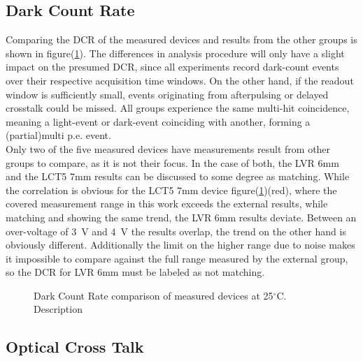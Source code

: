 \documentclass[12pt,article,type=msc,colorback,accentcolor=tud9c]{tudthesis}
\begin{document}
\subsection{Dark Count Rate}
\label{subsec:DC_DCR}

Comparing the DCR of the measured devices and results from the other groups is shown in figure(\ref{fig:DC_DCR}). The differences in analysis procedure will only have a slight impact on the presumed DCR, since all experiments record dark-count events over their respective acquisition time windows. On the other hand, if the readout window is sufficiently small, events originating from afterpulsing or delayed crosstalk could be missed. All groups experience the same multi-hit coincidence, meaning a light-event or dark-event coinciding with another, forming a (partial)multi p.e. event.\\
Only two of the five measured devices have measurements result from other groups to compare, as it is not their focus. In the case of both, the LVR 6mm and the LCT5 7mm results can be discussed to some degree as matching. While the correlation is obvious for the LCT5 7mm device figure(\ref{fig:DC_DCR})(red), where the covered measurement range in this work exceeds the  external results, while matching and showing the same trend, the LVR 6mm results deviate. Between an over-voltage of 3~V and 4~V the results overlap, the trend on the other hand is obviously different. Additionally the limit on the higher range due to noise makes it impossible to compare against the full range measured by the external group, so the DCR for LVR 6mm must be labeled as not matching. 

\begin{figure}%
\begin{centering}
\caption[DCR device comparison]{Dark Count Rate comparison of measured devices at 25$^\circ$C. Description}
\label{fig:DC_DCR}
\end{centering}
\end{figure}

\subsection{Optical Cross Talk}
\label{subsec:DC_OCT}
\end{document}
